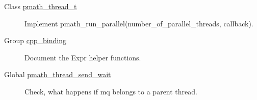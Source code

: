 \label{todo__todo000004}
\hypertarget{todo__todo000004}{}
 \begin{description}
\item[Class \hyperlink{classpmath__thread__t}{pmath\_\-thread\_\-t} ]Implement pmath\_\-run\_\-parallel(number\_\-of\_\-parallel\_\-threads, callback). \end{description}


\label{todo__todo000001}
\hypertarget{todo__todo000001}{}
 \begin{description}
\item[Group \hyperlink{group__cpp__binding}{cpp\_\-binding} ]Document the Expr helper functions.

\end{description}


\label{todo__todo000002}
\hypertarget{todo__todo000002}{}
 \begin{description}
\item[Global \hyperlink{group__threadmsg_g4ce8afcfec001a88441bdf8b50bcd157}{pmath\_\-thread\_\-send\_\-wait} ]Check, what happens if mq belongs to a parent thread. \end{description}
